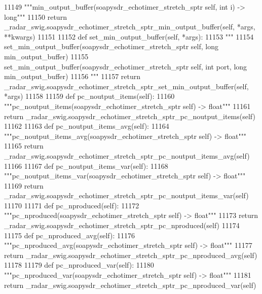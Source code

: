 \begin{DoxyCode}
{{{{{{{{{{{{{{{{{{{{{{{{{{{{{{{{{{{11149         \textcolor{stringliteral}{"""min\_output\_buffer(soapysdr\_echotimer\_stretch\_sptr self, int i) -> long"""}
11150         \textcolor{keywordflow}{return} \_radar\_swig.soapysdr\_echotimer\_stretch\_sptr\_min\_output\_buffer(self, *args, **kwargs)
11151 
11152     \textcolor{keyword}{def }set_min_output_buffer(self, *args):
11153         \textcolor{stringliteral}{"""}
11154 \textcolor{stringliteral}{        set\_min\_output\_buffer(soapysdr\_echotimer\_stretch\_sptr self, long min\_output\_buffer)}
11155 \textcolor{stringliteral}{        set\_min\_output\_buffer(soapysdr\_echotimer\_stretch\_sptr self, int port, long min\_output\_buffer)}
11156 \textcolor{stringliteral}{        """}
11157         \textcolor{keywordflow}{return} \_radar\_swig.soapysdr\_echotimer\_stretch\_sptr\_set\_min\_output\_buffer(self, *args)
11158 
11159     \textcolor{keyword}{def }pc_noutput_items(self):
11160         \textcolor{stringliteral}{"""pc\_noutput\_items(soapysdr\_echotimer\_stretch\_sptr self) -> float"""}
11161         \textcolor{keywordflow}{return} \_radar\_swig.soapysdr\_echotimer\_stretch\_sptr\_pc\_noutput\_items(self)
11162 
11163     \textcolor{keyword}{def }pc_noutput_items_avg(self):
11164         \textcolor{stringliteral}{"""pc\_noutput\_items\_avg(soapysdr\_echotimer\_stretch\_sptr self) -> float"""}
11165         \textcolor{keywordflow}{return} \_radar\_swig.soapysdr\_echotimer\_stretch\_sptr\_pc\_noutput\_items\_avg(self)
11166 
11167     \textcolor{keyword}{def }pc_noutput_items_var(self):
11168         \textcolor{stringliteral}{"""pc\_noutput\_items\_var(soapysdr\_echotimer\_stretch\_sptr self) -> float"""}
11169         \textcolor{keywordflow}{return} \_radar\_swig.soapysdr\_echotimer\_stretch\_sptr\_pc\_noutput\_items\_var(self)
11170 
11171     \textcolor{keyword}{def }pc_nproduced(self):
11172         \textcolor{stringliteral}{"""pc\_nproduced(soapysdr\_echotimer\_stretch\_sptr self) -> float"""}
11173         \textcolor{keywordflow}{return} \_radar\_swig.soapysdr\_echotimer\_stretch\_sptr\_pc\_nproduced(self)
11174 
11175     \textcolor{keyword}{def }pc_nproduced_avg(self):
11176         \textcolor{stringliteral}{"""pc\_nproduced\_avg(soapysdr\_echotimer\_stretch\_sptr self) -> float"""}
11177         \textcolor{keywordflow}{return} \_radar\_swig.soapysdr\_echotimer\_stretch\_sptr\_pc\_nproduced\_avg(self)
11178 
11179     \textcolor{keyword}{def }pc_nproduced_var(self):
11180         \textcolor{stringliteral}{"""pc\_nproduced\_var(soapysdr\_echotimer\_stretch\_sptr self) -> float"""}
11181         \textcolor{keywordflow}{return} \_radar\_swig.soapysdr\_echotimer\_stretch\_sptr\_pc\_nproduced\_var(self)
}}}}}}}}}}}}}}}}}}}}}}}}}}}}}}}}}}}
\end{DoxyCode}

